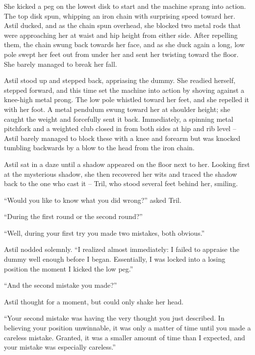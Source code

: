 \documentclass[12pt]{book}
\begin{document}
She kicked a peg on the lowest disk to start and the machine sprang into action.  The top disk spun, whipping an iron chain with surprising speed toward her.  Astil ducked, and as the chain spun overhead, she blocked two metal rods that were approaching her at waist and hip height from either side.  After repelling them, the chain swung back towards her face, and as she duck again a long, low pole swept her feet out from under her and sent her twisting toward the floor.  She barely managed to break her fall. 
    
Astil stood up and stepped back, appriasing the dummy.  She readied herself, stepped forward, and this time set the machine into action by shoving against a knee-high metal prong.  The low pole whistled toward her feet, and she repelled it with her foot.  A metal pendulum swung toward her at shoulder height; she caught the weight and forcefully sent it back.  Immediately, a spinning metal pitchfork and a weighted club closed in from both sides at hip and rib level -- Astil barely managed to block these with a knee and forearm but was knocked tumbling backwards by a blow to the head from the iron chain.  

Astil sat in a daze until a shadow appeared on the floor next to her.  Looking first at the mysterious shadow, she then recovered her wits and traced the shadow back to the one who cast it -- Tril, who stood several feet behind her, smiling.  

``Would you like to know what you did wrong?'' asked Tril.

``During the first round or the second round?'' 

``Well, during your first try you made two mistakes, both obvious.''  

Astil nodded solemnly.  ``I realized almost immediately: I failed to appraise the dummy well enough before I began.  Essentially, I was locked into a losing position the moment I kicked the low peg.''

``And the second mistake you made?''  

Astil thought for a moment, but could only shake her head.

``Your second mistake was having the very thought you just described.  In believing your position unwinnable, it was only a matter of time until you made a careless mistake.  Granted, it was a smaller amount of time than I expected, and your mistake was especially careless.''
\end{document}
